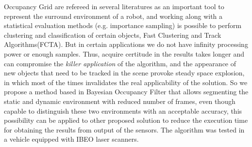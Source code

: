 Occupancy Grid are refereed in several literatures as an important tool to represent the surround environment of a robot, and working along with a statistical evaluation methods (e.g. importance sampling) is possible to perform clustering and classification of certain objects, Fast Clustering and Track Algorithms(FCTA). But in certain applications we do not have infinity processing power or enough samples. Thus, acquire certitude in the results takes longer and can compromise the \textit{killer application} of the algorithm, and the appearance of new objects that need to be tracked in the scene provoke steady space explosion, in which most of the times invalidates the real applicability of the solution. So we propose a method based in Bayesian Occupancy Filter that allows segmenting the static and dynamic environment with reduced number of frames, even though capable to distinguish these two environments with an acceptable accuracy, this possibility can be applied to other proposed solution to reduce the execution time for obtaining the results from output of the sensors. The algorithm was tested in a vehicle equipped with IBEO laser scanners.


